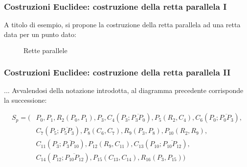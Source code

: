\documentclass[11pt]{beamer}
\begin{document}
\begin{frame}
\frametitle{Costruzioni Euclidee: costruzione della retta parallela I}
A titolo di esempio, si propone la costruzione della retta parallela ad una retta data per un punto dato:

\begin{figure}[!h]
\begin{center}
\caption{Rette parallele}
\end{center}
\end{figure}
\end{frame}


\begin{frame}
\frametitle{Costruzioni Euclidee: costruzione della retta parallela II}
... Avvalendosi della notazione introdotta, al diagramma precedente corrisponde la successione:

\begin{align*}
S_{p} = (&P_{0}, P_{1}, R_{2}(P_{0}, P_{1}), P_{3}, C_{4}(P_{3}; \overline{P_{3} P_{0}}), P_{5}(R_{2},C_{4}), C_{6}(P_{0}; \overline{P_{0} P_{3}}), \\
&C_{7}(P_{5}; \overline{P_{5} P_{3}}), P_{8}(C_{6},C_{7}), R_{9}(P_{3}, P_{8}), P_{10}(R_{2},R_{9}), \\
& C_{11}(P_{3}; \overline{P_{3} P_{10}}), P_{12}(R_{9}, C_{11}), C_{13}(P_{10}; \overline{P_{10} P_{12}}), \\
&  C_{14}(P_{12}; \overline{P_{10} P_{12}}),  P_{15}(C_{13},C_{14}), R_{16}(P_{3}, P_{15}) )
\end{align*}
\end{frame}
\end{document}
